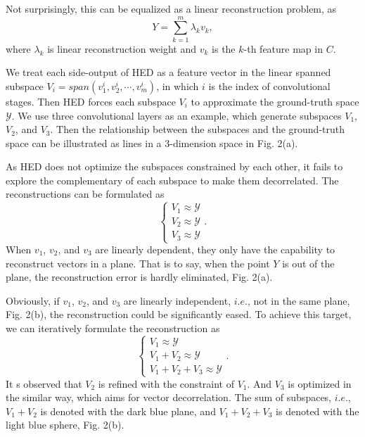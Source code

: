 \documentclass[runningheads]{llncs}
\begin{document}
Not surprisingly, this can be equalized as a linear reconstruction problem, as
\begin{equation}{ Y} = \sum\limits_{k = 1}^m {{\lambda _k}{v_k}},
   \label{hed::reconstruction}
\end{equation}
where ${\lambda _k}$ is linear reconstruction weight and $v_k$  is the $k$-th feature map in $C$. 

We treat each side-output of HED as a feature vector in the linear spanned subspace $V_i=span({v_1^i,v_2^i,\cdots,v_m^i})$, in which $i$ is the index of convolutional stages. Then HED forces each subspace $V_i$ to approximate the ground-truth space $\mathcal{Y}$. We use three convolutional layers as an example, which generate subspaces $V_1$, $V_2$, and $V_3$. Then the relationship between the subspaces and the ground-truth space can be illustrated as lines in a 3-dimension space in Fig. 2(a).  

As HED does not optimize the subspaces constrained by each other, it fails to explore the complementary of each subspace to make them decorrelated. The reconstructions can be formulated as
\begin{equation}
\left\{\begin{array}{l}
V_1 \approx \mathcal{Y}\\ 
V_2 \approx \mathcal{Y}\\
V_3 \approx \mathcal{Y}
\end{array}.\right.
\label{hed:span}
\end{equation}
When $v_1$, $v_2$, and $v_3$ are linearly dependent, they only have the capability to reconstruct vectors in a plane. That is to say, when the point $Y$ is out of the plane, the reconstruction error is hardly eliminated, Fig. 2(a). 

Obviously, if $v_1$, $v_2$, and $v_3$ are linearly independent, $i.e.$, not in the same plane, Fig. 2(b), the reconstruction could be significantly eased. To achieve this target, we can iteratively formulate the reconstruction as
\begin{equation}
\left\{\begin{array}{l}
V_1 \approx \mathcal{Y}\\ 
V_1 + V_2 \approx \mathcal{Y} \\
V_1 + V_2 + V_3 \approx \mathcal{Y} 
\end{array}.\right.
\label{lsn::span}
\end{equation}
It s observed that $V_2$ is refined with the constraint of $V_1$. And $V_3$ is optimized in the similar way, which aims for vector decorrelation.  The sum of subspaces, $i.e.$, $V_1+V_2$ is denoted with the dark blue plane, and $V_1+V_2+V_3$ is denoted with the light blue sphere, Fig. 2(b). 
\end{document}

